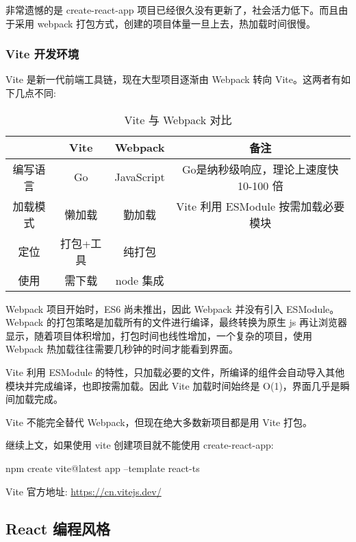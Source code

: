 非常遗憾的是 create-react-app 项目已经很久没有更新了，社会活力低下。而且由于采用 webpack 打包方式，创建的项目体量一旦上去，热加载时间很慢。

\subsubsection{Vite 开发环境}

Vite 是新一代前端工具链，现在大型项目逐渐由 Webpack 转向 Vite。这两者有如下几点不同:

\begin{table}[H]
    \centering
    \caption{Vite 与 Webpack 对比}
    \label{table:Vite 与 Webpack 对比}
    \setlength{\tabcolsep}{4mm}
    \begin{tabular}{c|ccc}
        \toprule
        \textbf{} & \textbf{Vite} & \textbf{Webpack} & \textbf{备注} \\
        \midrule
        编写语言 & Go & JavaScript & Go是纳秒级响应，理论上速度快 10-100 倍 \\
        加载模式 & 懒加载 & 勤加载 & Vite 利用 ESModule 按需加载必要模块 \\
        定位 & 打包+工具 & 纯打包 &  \\
        使用 & 需下载 & node 集成 &  \\
        \bottomrule
    \end{tabular}
\end{table}

Webpack 项目开始时，ES6 尚未推出，因此 Webpack 并没有引入 ESModule。Webpack 的打包策略是加载所有的文件进行编译，最终转换为原生 js 再让浏览器显示，随着项目体积增加，打包时间也线性增加，一个复杂的项目，使用 Webpack 热加载往往需要几秒钟的时间才能看到界面。

Vite 利用 ESModule 的特性，只加载必要的文件，所编译的组件会自动导入其他模块并完成编译，也即按需加载。因此 Vite 加载时间始终是 O(1)，界面几乎是瞬间加载完成。

Vite 不能完全替代 Webpack，但现在绝大多数新项目都是用 Vite 打包。

继续上文，如果使用 vite 创建项目就不能使用 create-react-app:

\begin{bash}
npm create vite@latest app --template react-ts
\end{bash}

Vite 官方地址: \url{https://cn.vitejs.dev/}

\subsection{React 编程风格}


